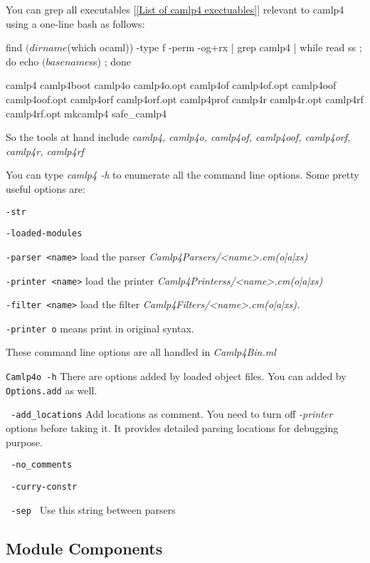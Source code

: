 You can grep all executables [\ref{List of camlp4 exectuables}]
relevant to camlp4 using a one-line bash as follows:

\begin{bashcode}
find $(dirname $(which ocaml)) -type f -perm -og+rx | grep camlp4 |
while read ss ; do echo $(basename $ss) ; done
\end{bashcode}

\begin{bashcode}  
camlp4 camlp4boot camlp4o camlp4o.opt camlp4of camlp4of.opt camlp4oof
camlp4oof.opt camlp4orf camlp4orf.opt camlp4prof camlp4r camlp4r.opt
camlp4rf camlp4rf.opt mkcamlp4 safe_camlp4
\end{bashcode}

So the tools at hand include \textit{camlp4, camlp4o, camlp4of,
  camlp4oof, camlp4orf, camlp4r, camlp4rf }

You can type \textit{camlp4 -h } to enumerate all the command line
options. Some pretty useful options are: 

\verb|-str|

\verb|-loaded-modules|

\verb|-parser <name>| load the parser \textit{Camlp4Parsers/<name>.cm(o|a|xs)}


\verb|-printer <name>| load the printer
\textit{Camlp4Printerss/<name>.cm(o|a|xs)}

\verb|-filter <name>| load the filter 
\textit{Camlp4Filters/<name>.cm(o|a|xs).}


\verb|-printer o| means print in original syntax. 


These command line options are all handled in \emph{Camlp4Bin.ml}

\verb|Camlp4o -h| There are options added by loaded object files. You
can added by \verb|Options.add| as well.


\verb| -add_locations| Add locations as comment. You need to turn off
\textit{-printer} options before taking it. It provides detailed
parsing locations for debugging purpose.


\verb| -no_comments|


\verb| -curry-constr |


\verb| -sep | Use this string between parsers 




\subsection{Module Components}


